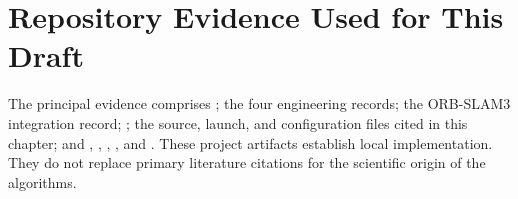 \section*{Repository Evidence Used for This Draft}

The principal evidence comprises ; the four
 engineering records; the ORB-SLAM3 integration
record; ; the
source, launch, and configuration files cited in this chapter; and
, ,
, , and
. These project artifacts establish local
implementation. They do not replace primary literature citations for the
scientific origin of the algorithms.
